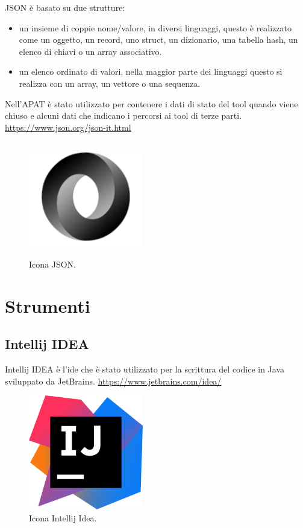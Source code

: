 JSON è basato su due strutture:
\begin{itemize}
    \item un insieme di coppie nome/valore, in diversi linguaggi, questo è realizzato come un oggetto, un record, uno struct, un dizionario, una tabella hash, un elenco di chiavi o un array associativo.
    \item un elenco ordinato di valori, nella maggior parte dei linguaggi questo si realizza con un array, un vettore o una sequenza.
\end{itemize}
Nell'APAT è stato utilizzato per contenere i dati di stato del tool quando viene chiuso e alcuni dati che indicano i percorsi ai tool di terze parti.
\url{https://www.json.org/json-it.html}
\begin{figure}[H]
    \centering
    \includegraphics[width=5cm, height=5cm]{./immagini/json.png}
    \caption{Icona JSON.}\label{fig:json}
\end{figure}


\section{Strumenti}\label{sec:strumenti}

\subsection*{Intellij IDEA}
Intellij IDEA è l'\gls{ide} che è stato utilizzato per la scrittura del codice in Java sviluppato da JetBrains.
\url{https://www.jetbrains.com/idea/}
\begin{figure}[H]
    \centering
    \includegraphics[width=5cm, height=5cm]{./immagini/intellij.png}
    \caption{Icona Intellij Idea.}\label{fig:intellij}
\end{figure}


